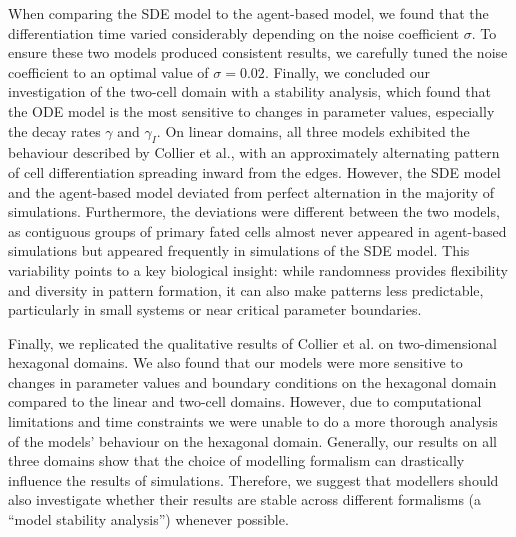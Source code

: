 \documentclass{article}
\begin{document}
When comparing the SDE model to the agent-based model, we found that the differentiation time varied considerably depending on the noise coefficient $\sigma$.
To ensure these two models produced consistent results, we carefully tuned the noise coefficient to an optimal value of $\sigma = 0.02$.
Finally, we concluded our investigation of the two-cell domain with a stability analysis, which found that the ODE model is the most sensitive to changes in parameter values, especially the decay rates $\gamma$ and $\gamma_{I}$.
On linear domains, all three models exhibited the behaviour described by Collier et al., with an approximately alternating pattern of cell differentiation spreading inward from the edges.
However, the SDE model and the agent-based model deviated from perfect alternation in the majority of simulations.
Furthermore, the deviations were different between the two models, as contiguous groups of primary fated cells almost never appeared in agent-based simulations but appeared frequently in simulations of the SDE model.
This variability points to a key biological insight: while randomness provides flexibility and diversity in pattern formation, it can also make patterns less predictable, particularly in small systems or near critical parameter boundaries.

Finally, we replicated the qualitative results of Collier et al. on two-dimensional hexagonal domains. 
We also found that our models were more sensitive to changes in parameter values and boundary conditions on the hexagonal domain compared to the linear and two-cell domains.
However, due to computational limitations and time constraints we were unable to do a more thorough analysis of the models' behaviour on the hexagonal domain.
Generally, our results on all three domains show that the choice of modelling formalism can drastically influence the results of simulations.
Therefore, we suggest that modellers should also investigate whether their results are stable across different formalisms (a ``model stability analysis'') whenever possible.

\nocite{*}
\printbibliography

\appendix
\end{document}
